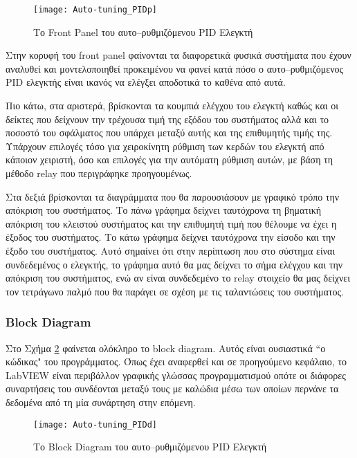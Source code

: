 \begin{figure}[h]
  \centering
  \texttt{[image: Auto-tuning\_PIDp]}
  \caption{Το Front Panel του αυτο--ρυθμιζόμενου PID Ελεγκτή}
  \label{fig:Auto-tuning_PIDp}
\end{figure}

Στην κορυφή του front panel φαίνονται τα διαφορετικά φυσικά συστήματα που έχουν αναλυθεί και μοντελοποιηθεί προκειμένου να φανεί κατά πόσο ο αυτο--ρυθμιζόμενος PID ελεγκτής είναι ικανός να ελέγξει αποδοτικά το καθένα από αυτά.

Πιο κάτω, στα αριστερά, βρίσκονται τα κουμπιά ελέγχου του ελεγκτή καθώς και οι δείκτες που δείχνουν την τρέχουσα τιμή της εξόδου του συστήματος αλλά και το ποσοστό του σφάλματος που υπάρχει μεταξύ αυτής και της επιθυμητής τιμής της. Υπάρχουν επιλογές τόσο για χειροκίνητη ρύθμιση των κερδών του ελεγκτή από κάποιον χειριστή, όσο και επιλογές για την αυτόματη ρύθμιση αυτών, με βάση τη μέθοδο relay που περιγράφηκε προηγουμένως.

Στα δεξιά βρίσκονται τα διαγράμματα που θα παρουσιάσουν με γραφικό τρόπο την απόκριση του συστήματος. Το πάνω γράφημα δείχνει ταυτόχρονα τη βηματική απόκριση του κλειστού συστήματος και την επιθυμητή τιμή που θέλουμε να έχει η έξοδος του συστήματος. Το κάτω γράφημα δείχνει ταυτόχρονα την είσοδο και την έξοδο του συστήματος. Αυτό σημαίνει ότι στην περίπτωση που στο σύστημα είναι συνδεδεμένος ο ελεγκτής, το γράφημα αυτό θα μας δείχνει το σήμα ελέγχου και την απόκριση του συστήματος, ενώ αν είναι συνδεδεμένο το relay στοιχείο θα μας δείχνει τον τετράγωνο παλμό που θα παράγει σε σχέση με τις ταλαντώσεις του συστήματος.

\subsubsection{Block Diagram}

Στο Σχήμα \ref{fig:Auto-tuning_PIDd} φαίνεται ολόκληρο το block diagram. Αυτός είναι ουσιαστικά ``ο κώδικας" του προγράμματος. Όπως έχει αναφερθεί και σε προηγούμενο κεφάλαιο, το LabVIEW είναι περιβάλλον γραφικής γλώσσας προγραμματισμού οπότε οι διάφορες συναρτήσεις του συνδέονται μεταξύ τους με καλώδια μέσω των οποίων περνάνε τα δεδομένα από τη μία συνάρτηση στην επόμενη. 

\begin{figure}[h]
  \centering
  \texttt{[image: Auto-tuning\_PIDd]}
  \caption{Το Block Diagram του αυτο--ρυθμιζόμενου PID Ελεγκτή}
  \label{fig:Auto-tuning_PIDd}
\end{figure}

